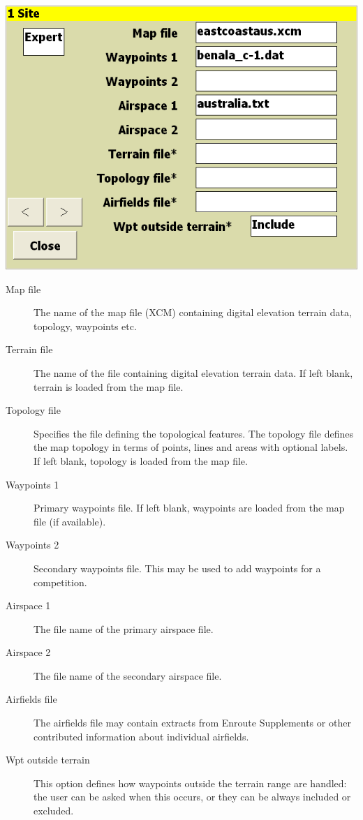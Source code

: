 \documentclass[a4paper,12pt]{refrep}
\begin{document}
\begin{center}
\includegraphics[angle=0,width=\linewidth,keepaspectratio='true']{figures/config-0.png}
\end{center}

\begin{description}
\item[Map file]  The name of the map file (XCM) containing digital elevation
  terrain data, topology, waypoints etc.
\item[Terrain file]  The name of the file containing digital elevation
  terrain data.  If left blank, terrain is loaded from the map file.
\item[Topology file]  Specifies the file defining the topological features.
The topology file defines the map topology in terms of points, lines
and areas with optional labels.  If left blank, topology is loaded from the map file.
\item[Waypoints 1]
Primary waypoints file.  If left blank, waypoints are loaded from the map file
(if available).
\item[Waypoints 2]
Secondary waypoints file.  This may be used to add waypoints for a competition.
\item[Airspace 1] The file name of the primary airspace file.
\item[Airspace 2] The file name of the secondary airspace file.
\item[Airfields file]
The airfields file may contain extracts from Enroute Supplements or
other contributed information about individual airfields.
\item[Wpt outside terrain] This option defines how waypoints outside the 
  terrain range are handled: the user can be asked when this occurs,
  or they can be always included or excluded.
\end{description}
\end{document}
